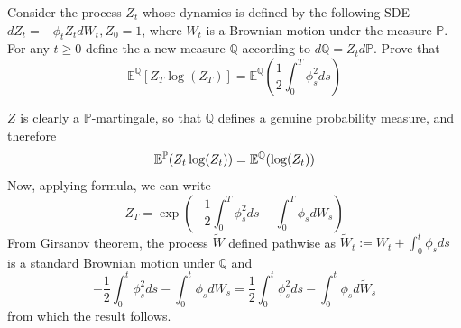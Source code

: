 \documentclass[12pt,a4paper]{exam}
\begin{document}
\begin{questions}
\question Consider the process $Z_t$ whose dynamics is defined by the following SDE $dZ_t = -\phi_tZ_tdW_t, Z_0=1$, where $W_t$ is a Brownian motion under the measure $\mathbb{P}$. For any $t\geq 0$ define the a new measure $\mathbb{Q}$ according to $d\mathbb{Q}=Z_t d\mathbb{P}$.
Prove that 
\begin{equation*}
\mathbb{E}^{\mathbb{Q}}[Z_T\log(Z_T)] = \mathbb{E}^{\mathbb{Q}}\left(\frac{1}{2}\int_0^T\phi_s^2 ds\right)
\end{equation*}

\fillwithlines{3cm}
\begin{solution}
$Z$ is clearly a $\mathbb{P}$-martingale, so that $\mathbb{Q}$ defines a genuine probability measure, and therefore
\begin{equation*}
\mathbb{E}^\mathbb{P}(Z_t\log(Z_t)) = \mathbb{E}^\mathbb{Q}(\log(Z_t))
\end{equation*}
Now, applying \ito formula, we can write
\begin{equation*}
Z_T = \exp\left(-\frac{1}{2}\int_0^T \phi_s^2 ds - \int_0^T \phi_s dW_s\right)
\end{equation*}
From Girsanov theorem, the process $\tilde{W}$ defined pathwise as $\tilde{W}_t := W_t +\int_0^t\phi_s ds$ is a standard Brownian motion under $\mathbb{Q}$ and 
\begin{equation*}
-\frac{1}{2}\int_0^t \phi_s^2 ds - \int_0^t \phi_s dW_s = \frac{1}{2}\int_0^t \phi_s^2 ds - \int_0^t \phi_s d\tilde{W}_s
\end{equation*}
from which the result follows.
\end{solution}


\end{questions}
\end{document}
